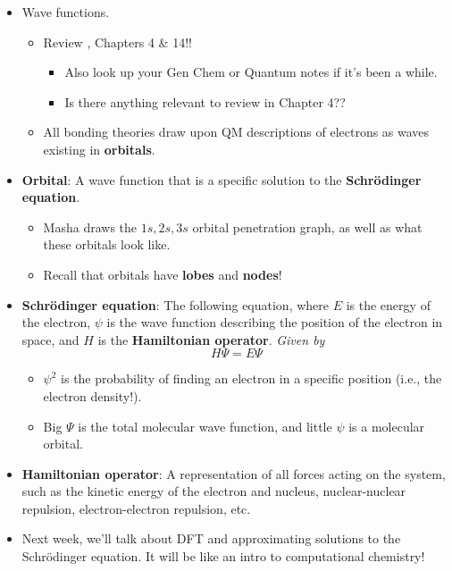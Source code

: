 \documentclass[../notes.tex]{subfiles}
\begin{document}
\begin{itemize}
\begin{itemize}
\begin{itemize}
        \end{itemize}
    \end{itemize}
    \item Wave functions.
    \begin{itemize}
        \item Review \textcite{bib:Anslyn}, Chapters 4 \& 14!!
        \begin{itemize}
            \item Also look up your Gen Chem or Quantum notes if it's been a while.
            \item Is there anything relevant to review in Chapter 4??
        \end{itemize}
        \item All bonding theories draw upon QM descriptions of electrons as waves existing in \textbf{orbitals}.
    \end{itemize}
    \item \textbf{Orbital}: A wave function that is a specific solution to the \textbf{Schr\"{o}dinger equation}.
    \begin{itemize}
        \item Masha draws the $1s,2s,3s$ orbital penetration graph, as well as what these orbitals look like.
        \item Recall that orbitals have \textbf{lobes} and \textbf{nodes}!
    \end{itemize}
    \item \textbf{Schr\"{o}dinger equation}: The following equation, where $E$ is the energy of the electron, $\psi$ is the wave function describing the position of the electron in space, and $H$ is the \textbf{Hamiltonian operator}. \emph{Given by}
    \begin{equation*}
        H\Psi = E\Psi
    \end{equation*}
    \begin{itemize}
        \item $\psi^2$ is the probability of finding an electron in a specific position (i.e., the electron density!).
        \item Big $\Psi$ is the total molecular wave function, and little $\psi$ is a molecular orbital.
    \end{itemize}
    \item \textbf{Hamiltonian operator}: A representation of all forces acting on the system, such as the kinetic energy of the electron and nucleus, nuclear-nuclear repulsion, electron-electron repulsion, etc.
    \item Next week, we'll talk about DFT and approximating solutions to the Schr\"{o}dinger equation. It will be like an intro to computational chemistry!

\end{itemize}
\end{document}
